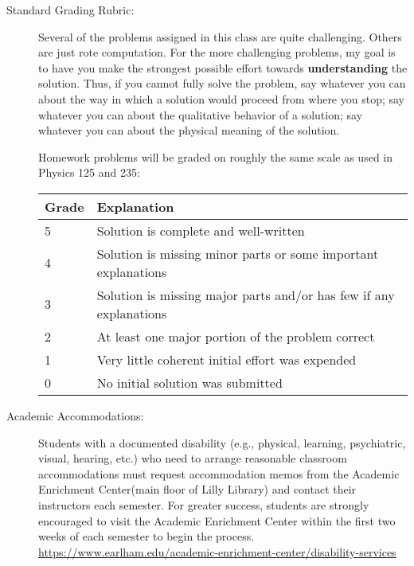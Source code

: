 \documentclass[12pt]{article}
\begin{document}
{\begin{description}
  \item[Standard Grading Rubric:]
        Several of the problems assigned in this class are
        quite challenging. Others are just rote computation. For the more
        challenging problems, my goal is to have you make the strongest
        possible effort towards \textbf{understanding} the solution. Thus, if
        you cannot fully solve the problem, say whatever you can about the way
        in which a solution would proceed from where you stop; say whatever
        you can about the qualitative behavior of a solution; say whatever you
        can about the physical meaning of the solution. 

        Homework problems will be graded on roughly the same scale as used in
        Physics 125 and 235:
\setlength{\arrayrulewidth}{1mm}
\setlength{\tabcolsep}{8pt}
{
\begin{table}[H]
\label{tab:standard-grading-rubric-table}
\begin{tabular}{ll}
\hline
 \textbf{Grade} & \textbf{Explanation}       \\ \hline
  5 & Solution is complete and well-written\\
  4 & Solution is missing minor parts or some important explanations\\
  3 & Solution is missing major parts and/or has few if any explanations\\
  2 & At least one major portion of the problem correct\\
  1 & Very little coherent initial effort was expended\\
  0 & No initial solution was submitted\\
\end{tabular}
\end{table}
        }

  \item[Academic Accommodations:] 
        Students with a documented disability (e.g., physical,
        learning, psychiatric, visual, hearing, etc.) who need to
        arrange reasonable classroom accommodations must request
        accommodation memos from the Academic Enrichment Center(main
        floor of Lilly Library) and contact their  instructors each
        semester. For greater success, students are strongly
        encouraged to visit the Academic Enrichment Center within the
        first two weeks of each semester to begin the process.
        {\small
        \url{https://www.earlham.edu/academic-enrichment-center/disability-services}}



\end{description}}
\end{document}
